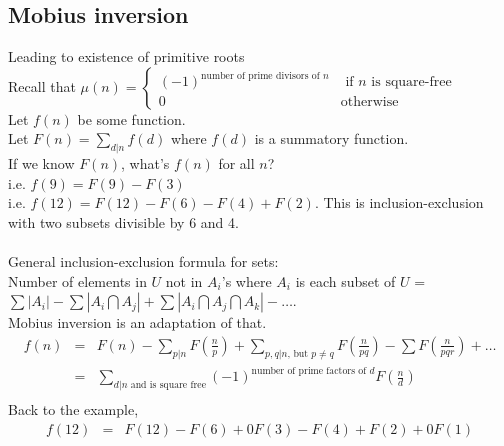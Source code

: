 \subsection*{Mobius inversion}
  Leading to existence of primitive roots\\
  Recall that $\mu(n) = \begin{cases} (-1)^{\text{number of prime divisors of 
  $n$}} & \text{ if $n$ is square-free}\\ 0 & \text{otherwise} \end{cases}$\\
  Let $f(n)$ be some function.\\
  Let $F(n) = \sum_{d|n} f(d)$ where $f(d)$ is a summatory function.\\
  If we know $F(n)$, what's $f(n)$ for all $n$?\\
  i.e. $f(9) = F(9) - F(3)$\\
  i.e. $f(12) = F(12) - F(6) - F(4) + F(2)$. This is inclusion-exclusion with
  two subsets divisible by 6 and 4.\\\\
  General inclusion-exclusion formula for sets:\\
  Number of elements in $U$ not in $A_i$'s where $A_i$ is each subset of $U$ =
  $\sum |A_i| - \sum |A_i \bigcap A_j| + \sum |A_i \bigcap A_j \bigcap A_k| -
  \ldots$.\\
  Mobius inversion is an adaptation of that.\\
  \begin{eqnarray*}
  f(n) &=& F(n) - \sum_{p | n} F(\frac{n}{p}) + \sum_{p,q | n\text{, but }p 
  \not= q} F(\frac{n}{pq}) - \sum F(\frac{n}{pqr}) + \ldots\\
  & = & \sum_{d|n \text{ and is square free}} (-1)^{\text{number of prime factors of $d$}} F(\frac{n}{d})\\
  \end{eqnarray*}
  Back to the example,
  \begin{eqnarray*}
    f(12) &=& F(12) - F(6) + 0F(3) - F(4) + F(2) + 0F(1)
  \end{eqnarray*}
